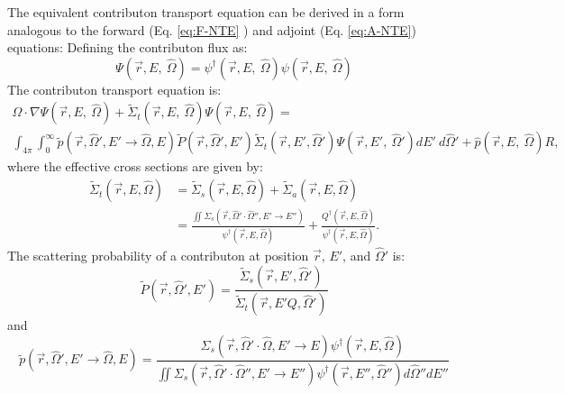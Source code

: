 The equivalent contributon transport equation can be derived in a form analogous
to the forward (Eq. \ref{eq:F-NTE} ) and adjoint (Eq. \ref{eq:A-NTE}) equations:
Defining the contributon flux as:
\begin{equation}
\Psi (\vec {r} ,E,\:\hat\Omega) = \psi^{\dagger} (\vec {r} ,E,\:\hat\Omega)
        \psi(\vec {r} ,E,\:\hat\Omega)
\label{eq.Cont-Flux}
\end{equation}
The contributon transport equation is:
\begin{multline}
\hat\Omega \cdot \nabla \Psi (\vec {r} ,E,\:\hat\Omega)
+\widetilde{\Sigma} _{ t }(\vec{r},E,\:\hat\Omega)\Psi (\vec { r } ,E,\:\hat\Omega)
     = \\
        \int _{ 4\pi  } \int _{ 0 }^{ \infty  }
        \widetilde{p}(\vec{r}, \hat\Omega', E'\rightarrow\hat\Omega, E)
        \widetilde{P}(\vec{r}, \hat\Omega',E')
        \widetilde{\Sigma} _{ t }(\vec{r}, E', \hat\Omega')
        \Psi (\vec { r } ,E',\: \hat\Omega')dE' \:d\hat\Omega'
        + \hat p(\vec { r } ,E, \:\hat\Omega) R ,
\label{eq:Cont-NTE}
\end{multline}
where the effective cross sections are given by:
\begin{equation}
\begin{aligned}
\widetilde{\Sigma}_{t}(\vec{r}, E, \hat\Omega) &=
        \widetilde{\Sigma}_{s}(\vec{r}, E, \hat\Omega) +
        \widetilde{\Sigma}_{a}(\vec{r}, E, \hat\Omega)    \\
     &= \frac{\iint \Sigma_{s}(\vec{r},\hat\Omega'\cdot\hat\Omega'',
        E'\rightarrow E'')}{\psi^{\dagger}(\vec{r}, E, \hat\Omega)}
        + \frac{Q^{\dagger}(\vec{r}, E, \hat\Omega)}
        {\psi^{\dagger}(\vec{r}, E, \hat\Omega)}.
\end{aligned}
\end{equation}
The scattering probability of a contributon at position $\vec{r}$, $E'$, and
$\hat\Omega'$ is:
\begin{equation}
\widetilde{P}(\vec{r}, \hat\Omega',E') =
         \frac{\widetilde{\Sigma} _{ s }(\vec{r}, E', \hat\Omega')}
       {\widetilde{\Sigma} _{ t }(\vec{r}, E'Q, \hat\Omega')}
\end{equation}
and
\begin{equation}
\widetilde{p}(\vec{r}, \hat\Omega', E'\rightarrow\hat\Omega, E) =
       \frac{\Sigma_{s}(\vec{r},\hat\Omega'\cdot\hat\Omega,E'\rightarrow E)
       \psi^{\dagger} (\vec{r}, E, \hat\Omega)}
       {\iint \Sigma_{s}(\vec{r},\hat\Omega'\cdot\hat\Omega'',E'\rightarrow
       E'')\psi^{\dagger} (\vec{r}, E'', \hat\Omega'')d\hat\Omega'' dE''}
\end{equation}
